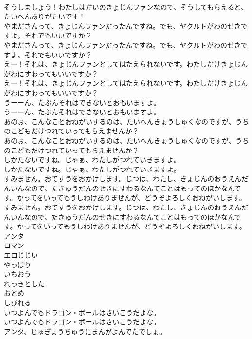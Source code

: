 \documentclass[8pt]{extreport}
\begin{document}
\begin{CJK}{UTF8}{min}
\\	そうしましょう！わたしはだいのきょじんファンなので、そうしてもらえると、たいへんありがたいです！
\\	やまださんって、きょじんファンだったんですね。でも、ヤクルトがわのせきですよ。それでもいいですか？
\\	やまださんって、きょじんファンだったんですね。でも、ヤクルトがわのせきですよ。それでもいいですか？
\\	えー！それは、きょじんファンとしてはたえられないです。わたしだけきょじんがわにすわってもいいですか？
\\	えー！それは、きょじんファンとしてはたえられないです。わたしだけきょじんがわにすわってもいいですか？
\\	うーーん、たぶんそれはできないとおもいますよ。
\\	うーーん、たぶんそれはできないとおもいますよ。
\\	あのぉ、こんなことおねがいするのは、たいへんきょうしゅくなのですが、うちのこどもだけつれていってもらえませんか？
\\	あのぉ、こんなことおねがいするのは、たいへんきょうしゅくなのですが、うちのこどもだけつれていってもらえませんか？
\\	しかたないですね。じゃぁ、わたしがつれていきますよ。
\\	しかたないですね。じゃぁ、わたしがつれていきますよ。
\\	すみません。おてすうをおかけします。じつは、わたし、きょじんのおうえんだんいんなので、たきゅうだんのせきにすわるなんてことはもってのほかなんです。かってをいってもうしわけありませんが、どうぞよろしくおねがいします。
\\	すみません。おてすうをおかけします。じつは、わたし、きょじんのおうえんだんいんなので、たきゅうだんのせきにすわるなんてことはもってのほかなんです。かってをいってもうしわけありませんが、どうぞよろしくおねがいします。
\\	アンタ
\\	ロマン
\\	エロじじい
\\	やっぱり
\\	いちおう
\\	れっきとした
\\	おとめ
\\	しびれる
\\	いつよんでもドラゴン・ボールはさいこうだよな。
\\	いつよんでもドラゴン・ボールはさいこうだよな。
\\	アンタ、じゅぎょうちゅうにまんがよんでたでしょ。

\end{CJK}
\end{document}
